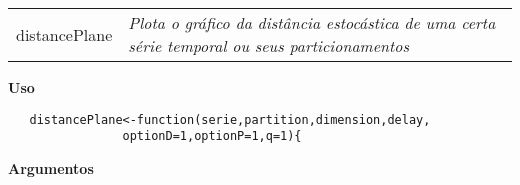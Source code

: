 \newpage

\hrulefill   

\begin{table}[!ht]
\begin{center}
\begin{tabularx}{\textwidth}{ X X}
\hspace{0.5cm} distancePlane & \textit{Plota o gráfico da distância estocástica de uma certa série temporal ou seus particionamentos}\\
\end{tabularx}
\end{center}
\end{table} 

\vspace{-0.5cm}

\hrulefill  

\vspace{0.5cm}

\textbf{Uso}

\begin{lstlisting}
   distancePlane<-function(serie,partition,dimension,delay,
   				optionD=1,optionP=1,q=1){
\end{lstlisting}

\vspace{0.5cm}

\textbf{Argumentos}

